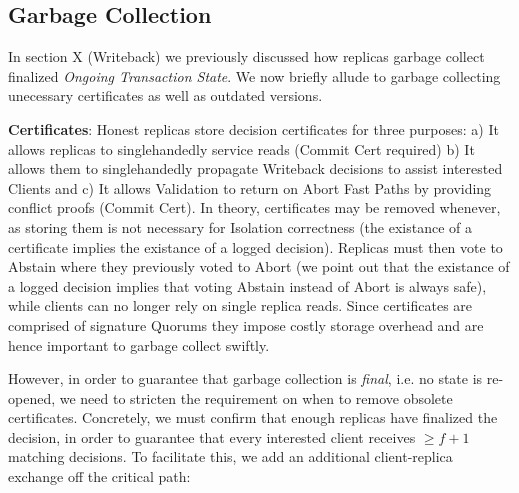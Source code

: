 \subsection{Garbage Collection}
In section X (Writeback) we previously discussed how replicas garbage collect finalized \textit{Ongoing Transaction State}. 
We now briefly allude to garbage collecting unecessary certificates as well as outdated versions.




\textbf{Certificates}: Honest replicas store decision certificates for three purposes: a) It allows replicas to singlehandedly service reads (Commit Cert required) b) It allows them to singlehandedly propagate Writeback decisions to assist interested Clients and c) It allows Validation to return on Abort Fast Paths by providing conflict proofs (Commit Cert).
In theory, certificates may be removed whenever, as storing them is not necessary for Isolation correctness (the existance of a certificate implies the existance of a logged decision). Replicas  must then vote to Abstain where they previously voted to Abort (we point out that the existance of a logged decision implies that voting Abstain instead of Abort is always safe), while clients can no longer rely on single replica reads. Since certificates are comprised of signature Quorums they impose costly storage overhead and are hence important to garbage collect swiftly.

However, in order to guarantee that garbage collection is \textit{final}, i.e. no state is re-opened, we need to stricten the requirement on when to remove obsolete certificates. Concretely, we must confirm that enough replicas have finalized the decision, in order to guarantee that every interested client receives $\geq f+1$ matching decisions.  To facilitate this, we add an additional client-replica exchange off the critical path:

